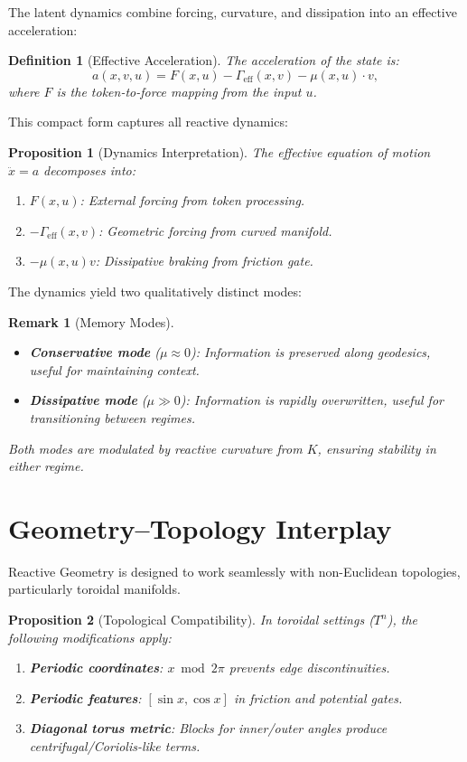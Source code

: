 \documentclass[12pt,letterpaper,twoside]{article}
\newtheorem{definition}{Definition}[section]
\newtheorem{remarque}{Remark}[section]
\newtheorem{prop}{Proposition}[section]
\begin{document}
The latent dynamics combine forcing, curvature, and dissipation into an effective acceleration:

\begin{definition}[Effective Acceleration]
The acceleration of the state is:
\[
a(x, v, u) = F(x, u) - \Gamma_{\text{eff}}(x, v) - \mu(x, u) \cdot v,
\]
where $F$ is the token-to-force mapping from the input $u$.
\end{definition}

This compact form captures all reactive dynamics:

\begin{prop}[Dynamics Interpretation]
The effective equation of motion $\ddot{x} = a$ decomposes into:
\begin{enumerate}
\item $F(x,u)$: External forcing from token processing.
\item $-\Gamma_{\text{eff}}(x,v)$: Geometric forcing from curved manifold.
\item $-\mu(x,u)v$: Dissipative braking from friction gate.
\end{enumerate}
\end{prop}

The dynamics yield two qualitatively distinct modes:

\begin{remarque}[Memory Modes]
\begin{itemize}
\item \textbf{Conservative mode} ($\mu \approx 0$): Information is preserved along geodesics, useful for maintaining context.
\item \textbf{Dissipative mode} ($\mu \gg 0$): Information is rapidly overwritten, useful for transitioning between regimes.
\end{itemize}
Both modes are modulated by reactive curvature from $K$, ensuring stability in either regime.
\end{remarque}

\section{Geometry–Topology Interplay}

Reactive Geometry is designed to work seamlessly with non-Euclidean topologies, particularly toroidal manifolds.

\begin{prop}[Topological Compatibility]
In toroidal settings ($T^n$), the following modifications apply:
\begin{enumerate}
\item \textbf{Periodic coordinates}: $x \bmod 2\pi$ prevents edge discontinuities.
\item \textbf{Periodic features}: $[\sin x, \cos x]$ in friction and potential gates.
\item \textbf{Diagonal torus metric}: Blocks for inner/outer angles produce centrifugal/Coriolis-like terms.
\end{enumerate}
\end{prop}
\end{document}
